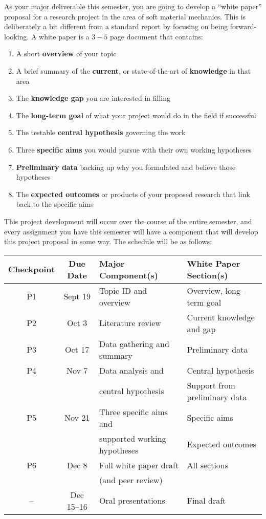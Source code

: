\documentclass[preprint,12pt,authoryear]{elsarticle}
\begin{document}
As your major deliverable this semester, you are going to develop a ``white paper'' proposal for a research project in the area of soft material mechanics. 
This is deliberately a bit different from a standard report by focusing on being forward-looking. 
A white paper is a $3-5$ page document that contains:
\begin{enumerate}
    \item A short \textbf{overview} of your topic
    \item A brief summary of the \textbf{current}, or state-of-the-art of \textbf{knowledge} in that area
    \item The \textbf{knowledge gap} you are interested in filling
    \item The \textbf{long-term goal} of what your project would do in the field if successful
    \item The testable \textbf{central hypothesis} governing the work
    \item Three \textbf{specific aims} you would pursue with their own working hypotheses
    \item \textbf{Preliminary data} backing up why you formulated and believe those hypotheses
    \item The \textbf{expected outcomes} or products of your proposed research that link back to the specific aims  
\end{enumerate}

This project development will occur over the course of the entire semester, and every assignment you have this semester will have a component that will develop this project proposal in some way. 
The schedule will be as follows:
\smallskip

\footnotesize
\begin{tabularx}{\textwidth}{ccXX}

\textbf{Checkpoint} & \textbf{Due Date} & \textbf{Major Component(s)} & \textbf{White Paper Section(s)} \\
\hline
\hline
P1 & Sept 19 & Topic ID and overview & Overview, long-term goal \\
\hline
P2 & Oct 3 & Literature review & Current knowledge and gap \\
\hline
P3 & Oct 17 & Data gathering and summary & Preliminary data \\
\hline
P4 & Nov 7 & Data analysis and & Central hypothesis \\
 &  & central hypothesis & Support from preliminary data \\
\hline
P5 & Nov 21 & Three specific aims and & Specific aims \\
 & & supported working hypotheses & Expected outcomes \\
\hline
P6 & Dec 8 & Full white paper draft & All sections \\
 &  & (and peer review) &  \\
\hline
-- & Dec 15--16 & Oral presentations & Final draft \\
\hline
\end{tabularx}
\normalsize
\end{document}

